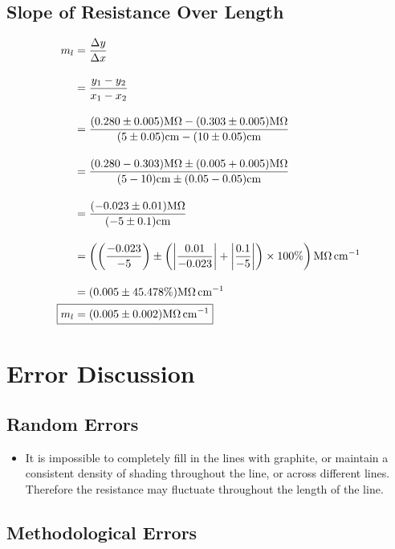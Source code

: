\documentclass[12pt]{article}
\begin{document}
\subsection{Slope of Resistance Over Length}

\begin{align*}
    m_l &= \frac{\Delta y}{\Delta x} \\[10pt]
    &= \frac{y_1 - y_2}{x_1 - x_2} \\[10pt]
    &= \frac{(0.280 \pm 0.005)\si{\mega\ohm} - (0.303 \pm 0.005)\si{\mega\ohm}}{(5 \pm 0.05)\si{cm} - (10 \pm 0.05)\si{cm}} \\[10pt]
    &= \frac{(0.280 - 0.303)\si{\mega\ohm} \pm (0.005 + 0.005)\si{\mega\ohm}}{(5 - 10)\si{cm} \pm (0.05 - 0.05)\si{cm}} \\[10pt]
    &= \frac{(-0.023 \pm 0.01)\si{\mega\ohm}}{(-5 \pm 0.1)\si{cm}} \\[10pt]
    &= \left( \left( \frac{-0.023}{-5} \right) \pm \left( \left| \frac{0.01}{-0.023} \right| + \left| \frac{0.1}{-5} \right| \right) \times 100\% \right) \si{\mega\ohm\per\cm} \\[10pt]
    &= (0.005 \pm 45.478\%) \si{\mega\ohm\per\cm} \\
    \Aboxed{m_l &= (0.005 \pm 0.002) \si{\mega\ohm\per\cm}}
\end{align*}

\newpage

\section{Error Discussion}

\subsection{Random Errors}

\begin{itemize}
    \item It is impossible to completely fill in the lines with graphite, or maintain a consistent density of shading throughout the line, or across different lines. Therefore the resistance may fluctuate throughout the length of the line.
\end{itemize}

\subsection{Methodological Errors}
\end{document}
